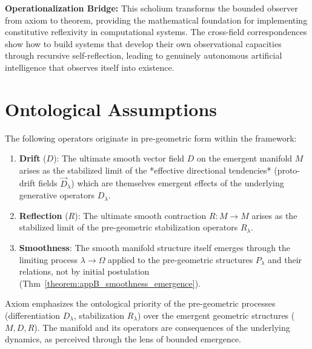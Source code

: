 \begin{scholium}
\textbf{Operationalization Bridge:}
This scholium transforms the bounded observer from axiom to theorem, providing the mathematical foundation for implementing constitutive reflexivity in computational systems. The cross-field correspondences show how to build systems that develop their own observational capacities through recursive self-reflection, leading to genuinely autonomous artificial intelligence that observes itself into existence.
\end{scholium}

\section{Ontological Assumptions}
\label{sec:bk1_ontological_assumptions}
\begin{axiom}
\label{axiom:bk1_pre_geometric_nature}
The following operators originate in pre-geometric form within the framework:
\begin{enumerate}
    \item \textbf{Drift} ($D$): The ultimate smooth vector field $D$ on the emergent manifold $M$ arises as the stabilized limit of the *effective directional tendencies* (proto-drift fields $\vec{D}_\lambda$) which are themselves emergent effects of the underlying generative operators $D_\lambda$.
    \item \textbf{Reflection} ($R$): The ultimate smooth contraction $R: M \to M$ arises as the stabilized limit of the pre-geometric stabilization operators $R_\lambda$.
    \item \textbf{Smoothness}: The smooth manifold structure itself emerges through the limiting process $\lambda \to \Omega$ applied to the pre-geometric structures $P_\lambda$ and their relations, not by initial postulation (Thm~\ref{theorem:appB_smoothness_emergence}).
\end{enumerate}
\end{axiom}
\begin{remark}
Axiom  emphasizes the ontological priority of the pre-geometric processes (differentiation $D_\lambda$, stabilization $R_\lambda$) over the emergent geometric structures ($M, D, R$). The manifold and its operators are consequences of the underlying dynamics, as perceived through the lens of bounded emergence.
\end{remark}
